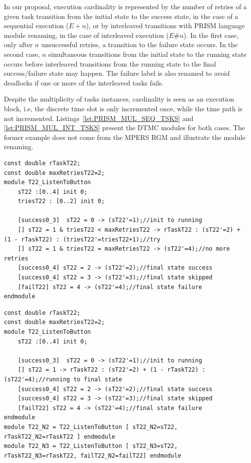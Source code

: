 In our proposal, execution cardinality is represented by the number of retries of a given task transition from the initial state to the success state, in the case of a sequential execution ($E+n$), or by interleaved transitions with PRISM language module renaming, in the case of interleaved execution ($E\#n$). In the first case, only after $n$ unsuccessful retries, a transition to the failure state occurs. In the second case, $n$ simultaneous transitions from the initial state to the running state occurs before interleaved transitions from the running state to the final success/failure state may happen. The failure label is also renamed to avoid deadlocks if one or more of the interleaved tasks fails.

Despite the multiplicity of tasks instances, cardinality is seen as an execution block, i.e, the discrete time slot is only incremented once, while the time path is not incremented. Listings~\ref{lst:PRISM_MUL_SEQ_TSKS} and \ref{lst:PRISM_MUL_INT_TSKS} present the DTMC modules for both cases. The former example does not come from the MPERS RGM and illustrate the module renaming.
\medskip

\begin{lstlisting}[language=Prism, caption={Sequential cardinality with n=2 for task T22.},label={lst:PRISM_MUL_SEQ_TSKS}] 
const double rTaskT22;
const double maxRetriesT22=2;
module T22_ListenToButton
	sT22 :[0..4] init 0;
	triesT22 : [0..2] init 0;	
	
	[success0_3]  sT22 = 0 -> (sT22'=1);//init to running
	[] sT22 = 1 & triesT22 < maxRetriesT22 -> rTaskT22 : (sT22'=2) + (1 - rTaskT22) : (triesT22'=triesT22+1);//try
	[] sT22 = 1 & triesT22 = maxRetriesT22 -> (sT22'=4);//no more retries
	[success0_4] sT22 = 2 -> (sT22'=2);//final state success
	[success0_4] sT22 = 3 -> (sT22'=3);//final state skipped
	[failT22] sT22 = 4 -> (sT22'=4);//final state failure
endmodule
\end{lstlisting}
\medskip

\begin{lstlisting}[language=Prism, caption={Interleaved cardinality with n=3 for task T22.},label={lst:PRISM_MUL_INT_TSKS}] 
const double rTaskT22;
const double maxRetriesT22=2;
module T22_ListenToButton
	sT22 :[0..4] init 0;
	
	[success0_3]  sT22 = 0 -> (sT22'=1);//init to running
	[] sT22 = 1 -> rTaskT22 : (sT22'=2) + (1 - rTaskT22) : (sT22'=4);//running to final state
	[success0_4] sT22 = 2 -> (sT22'=2);//final state success
	[success0_4] sT22 = 3 -> (sT22'=3);//final state skipped
	[failT22] sT22 = 4 -> (sT22'=4);//final state failure
endmodule
module T22_N2 = T22_ListenToButton [ sT22_N2=sT22, rTaskT22_N2=rTaskT22 ] endmodule
module T22_N3 = T22_ListenToButton [ sT22_N3=sT22, rTaskT22_N3=rTaskT22, failT22_N2=failT22] endmodule
\end{lstlisting}

